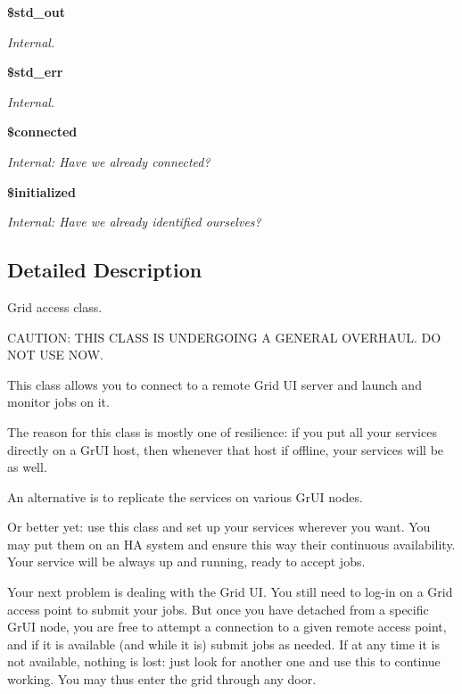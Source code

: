 \begin{CompactItemize}
{\bf \$std\_\-out}
\begin{CompactList}\small\item\em Internal. \item\end{CompactList}\item 
{\bf \$std\_\-err}
\begin{CompactList}\small\item\em Internal. \item\end{CompactList}\item 
{\bf \$connected}
\begin{CompactList}\small\item\em Internal: Have we already connected? \item\end{CompactList}\item 
{\bf \$initialized}
\begin{CompactList}\small\item\em Internal: Have we already identified ourselves? \item\end{CompactList}\end{CompactItemize}


\subsection{Detailed Description}
Grid access class. 

CAUTION: THIS CLASS IS UNDERGOING A GENERAL OVERHAUL. DO NOT USE NOW.

This class allows you to connect to a remote Grid UI server and launch and monitor jobs on it.

The reason for this class is mostly one of resilience: if you put all your services directly on a Gr\-UI host, then whenever that host if offline, your services will be as well.

An alternative is to replicate the services on various Gr\-UI nodes.

Or better yet: use this class and set up your services wherever you want. You may put them on an HA system and ensure this way their continuous availability. Your service will be always up and running, ready to accept jobs.

Your next problem is dealing with the Grid UI. You still need to log-in on a Grid access point to submit your jobs. But once you have detached from a specific Gr\-UI node, you are free to attempt a connection to a given remote access point, and if it is available (and while it is) submit jobs as needed. If at any time it is not available, nothing is lost: just look for another one and use this to continue working. You may thus enter the grid through any door.

